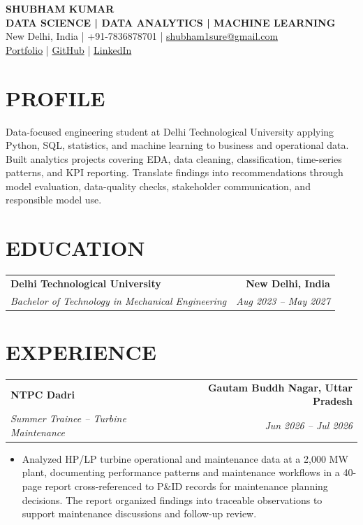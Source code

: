 \documentclass[10pt,a4paper]{article}
\makeatletter
\newcommand{\resumeSubheading}[4]{%
  \begin{tabular*}{\textwidth}{@{}l@{\extracolsep{\fill}}r@{}}
    \textbf{#1} & \textbf{#2} \\
    \textit{#3} & \textit{#4}
  \end{tabular*}\vspace{-3pt}
}
\makeatother
\begin{document}
\begin{center}
  {\LARGE\bfseries SHUBHAM KUMAR}\\[2pt]
  {\small\bfseries DATA SCIENCE \;|\; DATA ANALYTICS \;|\; MACHINE LEARNING}\\[2pt]
  New Delhi, India \;|\; +91-7836878701 \;|\;
  \href{mailto:shubham1sure@gmail.com}{shubham1sure@gmail.com}\\[2pt]
  \href{https://nothing0g.github.io/analyst/}{Portfolio}
  \;|\;
  \href{https://github.com/Nothing0g}{GitHub}
  \;|\;
  \href{https://www.linkedin.com/in/shubham-kumar-diff/}{LinkedIn}
\end{center}

\vspace{-8pt}

\section*{PROFILE}
Data-focused engineering student at Delhi Technological University applying Python, SQL, statistics, and machine learning to business and operational data. Built analytics projects covering EDA, data cleaning, classification, time-series patterns, and KPI reporting. Translate findings into recommendations through model evaluation, data-quality checks, stakeholder communication, and responsible model use.

\section*{EDUCATION}
\resumeSubheading
  {Delhi Technological University}{New Delhi, India}
  {Bachelor of Technology in Mechanical Engineering}{Aug 2023 -- May 2027}

\section*{EXPERIENCE}

\resumeSubheading
  {NTPC Dadri}{Gautam Buddh Nagar, Uttar Pradesh}
  {Summer Trainee -- Turbine Maintenance}{Jun 2026 -- Jul 2026}
\begin{itemize}
  \item Analyzed HP/LP turbine operational and maintenance data at a 2,000 MW plant, documenting performance patterns and maintenance workflows in a 40-page report cross-referenced to P\&ID records for maintenance planning decisions. The report organized findings into traceable observations to support maintenance discussions and follow-up review.
\end{itemize}
\end{document}
